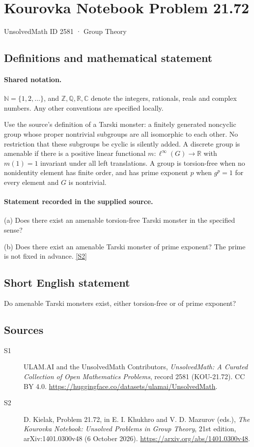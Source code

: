 \documentclass[11pt]{article}
\newcommand{\sref}[2]{\hyperlink{source:#1:#2}{[S#2]}}
\begin{document}
\setcounter{section}{2580}
\section{Kourovka Notebook Problem 21.72}\label{2581}
{\small\sffamily UnsolvedMath ID 2581 · Group Theory}
\subsection{Definitions and mathematical statement}

\paragraph{Shared notation.}$\mathbb N=\{1,2,\ldots\}$, and $\mathbb Z,\mathbb Q,\mathbb R,\mathbb C$ denote the integers, rationals, reals and complex numbers. Any other conventions are specified locally.


Use the source's definition of a Tarski monster: a finitely generated noncyclic group whose proper nontrivial subgroups are all isomorphic to each other. No restriction that these subgroups be cyclic is silently added. A discrete group is amenable if there is a positive linear functional $m:\ell^\infty(G)\to\mathbb R$ with $m(1)=1$ invariant under all left translations. A group is torsion-free when no nonidentity element has finite order, and has prime exponent $p$ when $g^p=1$ for every element and $G$ is nontrivial.
\paragraph{Statement recorded in the supplied source.}
(a) Does there exist an amenable torsion-free Tarski monster in the specified sense?

(b) Does there exist an amenable Tarski monster of prime exponent? The prime is not fixed in advance. \sref{2581}{2}
\subsection{Short English statement}
Do amenable Tarski monsters exist, either torsion-free or of prime exponent?
\subsection{Sources}
\begin{description}
\item[\hypertarget{source:2581:1}{S1}] ULAM.AI and the UnsolvedMath Contributors, \emph{UnsolvedMath: A Curated Collection of Open Mathematics Problems}, record 2581 (KOU-21.72). CC BY 4.0. \url{https://huggingface.co/datasets/ulamai/UnsolvedMath}.
\item[\hypertarget{source:2581:2}{S2}] D. Kielak, Problem 21.72, in E. I. Khukhro and V. D. Mazurov (eds.), \emph{The Kourovka Notebook: Unsolved Problems in Group Theory}, 21st edition, arXiv:1401.0300v48 (6 October 2026). \url{https://arxiv.org/abs/1401.0300v48}.
\end{description}
\label{end:2581}
\end{document}
